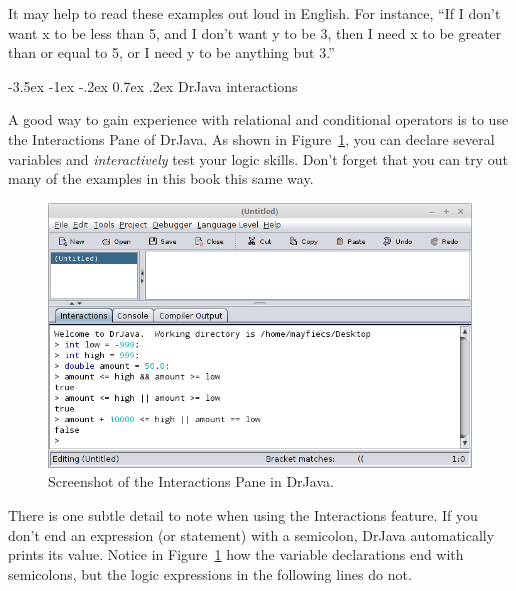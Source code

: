 \documentclass[12pt]{book}
\makeatletter
\theoremstyle{exercise}
\renewcommand{\section}{\@startsection {section}{1}{\z@}%
    {-3.5ex \@plus -1ex \@minus -.2ex}%
    {0.7ex \@plus.2ex}%
    {\normalfont\Large\bfseries}}
\makeatother
\begin{document}
It may help to read these examples out loud in English.
For instance, ``If I don't want x to be less than 5, and I don't want y to be 3, then I need x to be greater than or equal to 5, or I need y to be anything but 3.''


\section{DrJava interactions}

A good way to gain experience with relational and conditional operators is to use the Interactions Pane of DrJava.
As shown in Figure~\ref{fig:drjava}, you can declare several variables and {\it interactively} test your logic skills.
Don't forget that you can try out many of the examples in this book this same way.

%

\begin{figure}[!h]
\begin{center}
\includegraphics[width=\textwidth]{figs/drjava-logic.png}
\caption{Screenshot of the Interactions Pane in DrJava.}
\label{fig:drjava}
\end{center}
\end{figure}

There is one subtle detail to note when using the Interactions feature.
If you don't end an expression (or statement) with a semicolon, DrJava automatically prints its value.
Notice in Figure~\ref{fig:drjava} how the variable declarations end with semicolons, but the logic expressions in the following lines do not.
\end{document}
